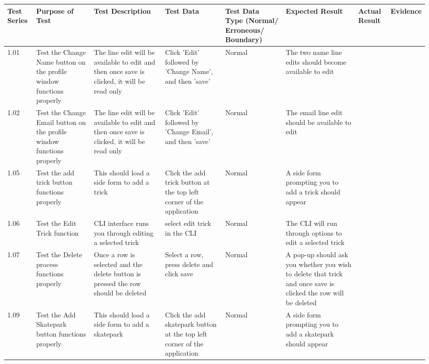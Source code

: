 \begin{landscape}
\begin{center}
    \begin{longtable}{|p{1.5cm}|p{2.5cm}|p{2.5cm}|p{2cm}|p{2cm}|p{2cm}|p{2cm}|p{2cm}|}
        \hline
        \textbf{Test Series} & \textbf{Purpose of Test} & \textbf{Test Description} & \textbf{Test Data} & \textbf{Test Data Type (Normal/ Erroneous/ Boundary)} & \textbf{Expected Result} & \textbf{Actual Result} & \textbf{Evidence}\\ \hline


1.01 & Test the Change Name button on the profile window functions properly  & The line edit will be available to edit and then once save is clicked, it will be read only  &  Click 'Edit' followed by 'Change Name', and then 'save' & Normal & The two name line edits should become available to edit & & \\ \hline

1.02 & Test the Change Email button on the profile window functions properly & The line edit will be available to edit and then once save is clicked, it will be read only & Click 'Edit' followed by 'Change Email', and then 'save' & Normal &  The email line edit should be available to edit & &  \\ \hline


1.05 & Test the add trick button functions properly & This should load a side form to add a trick & Click the add trick button at the top left corner of the application & Normal & A side form prompting you to add a trick should appear &  \\ \hline

1.06 & Test the Edit Trick function & CLI interface runs you through editing a selected trick & select edit trick in the CLI & Normal & The CLI will run through options to edit a selected trick &  \\ \hline

1.07 & Test the Delete process functions properly & Once a row is selected and the delete button is pressed the row should be deleted & Select a row, press delete and click save & Normal & A pop-up should ask you whether you wish to delete that trick and once save is clicked the row will be deleted &  \\ \hline



1.09 & Test the Add Skatepark button functions properly &  This should load a side form to add a skatepark & Click the add skatepark button at the top left corner of the application & Normal & A side form prompting you to add a skatepark should appear & &  \\ \hline


\end{longtable}
\end{center}
\end{landscape}
